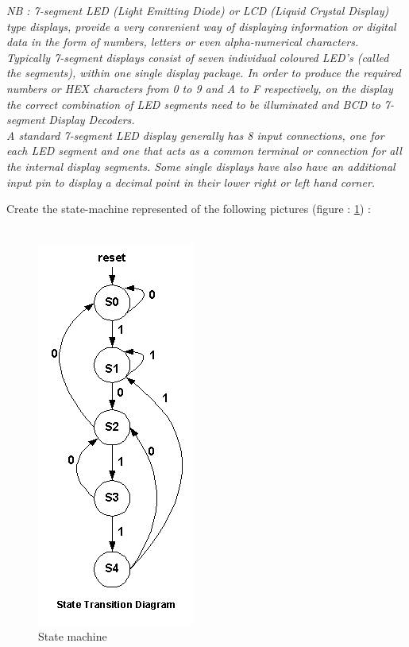 \documentclass[12pt]{tdtp}
\begin{document}
\textit{NB : 7-segment LED (Light Emitting Diode) or LCD (Liquid Crystal Display) type displays, provide a very convenient way of displaying information or digital data in the form of numbers, letters or even alpha-numerical characters.\\
Typically 7-segment displays consist of seven individual coloured LED’s (called the segments), within one single display package. In order to produce the required numbers or HEX characters from 0 to 9 and A to F respectively, on the display the correct combination of LED segments need to be illuminated and BCD to 7-segment Display Decoders.\\
A standard 7-segment LED display generally has 8 input connections, one for each LED segment and one that acts as a common terminal or connection for all the internal display segments. Some single displays have also have an additional input pin to display a decimal point in their lower right or left hand corner.}

\newpage
\Exo

Create the state-machine represented of the following pictures (figure : \ref{fsm_seq_detector}) :\\
\\


\begin{figure}[h!]
\begin{center}
\includegraphics[scale=0.7]{images/fsm_seq_detector.png}
\caption{State machine}
\label{fsm_seq_detector}
\end{center}
\end{figure}
\end{document}
